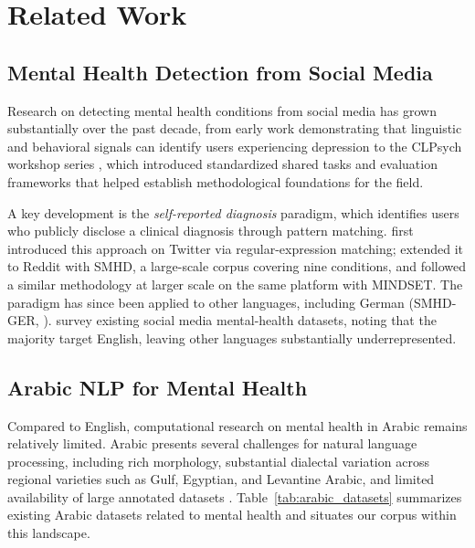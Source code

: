 \documentclass[letterpaper]{article} %
\begin{document}
\section{Related Work}
\label{sec:related_work}

\subsection{Mental Health Detection from Social Media}
\label{subsec:related_social_media}
Research on detecting mental health conditions from social media has grown substantially over the past decade, from early work demonstrating that linguistic and behavioral signals can identify users experiencing depression \citep{de2013predicting} to the CLPsych workshop series \citep{coppersmith2015clpsych}, which introduced standardized shared tasks and evaluation frameworks that helped establish methodological foundations for the field.

A key development is the \textit{self-reported diagnosis} paradigm, which identifies users who publicly disclose a clinical diagnosis through pattern matching. \citet{coppersmith2014quantifying} first introduced this approach on Twitter via regular-expression matching; \citet{cohan-etal-2018-smhd} extended it to Reddit with SMHD, a large-scale corpus covering nine conditions, and \citet{mankarious2025mindset} followed a similar methodology at larger scale on the same platform with MINDSET. The paradigm has since been applied to other languages, including German (SMHD-GER, \citealp{zanwar2023smhd}). \citet{harrigian2021state} survey existing social media mental-health datasets, noting that the majority target English, leaving other languages substantially underrepresented.

\subsection{Arabic NLP for Mental Health}
\label{subsec:related_arabic}

Compared to English, computational research on mental health in Arabic remains
relatively limited. Arabic presents several challenges for natural language
processing, including rich morphology, substantial dialectal variation across
regional varieties such as Gulf, Egyptian, and Levantine Arabic, and limited
availability of large annotated datasets \cite{darwish2021panoramic, alayba2025arabic}.
Table~\ref{tab:arabic_datasets} summarizes existing Arabic datasets related to
mental health and situates our corpus within this landscape.
\end{document}
